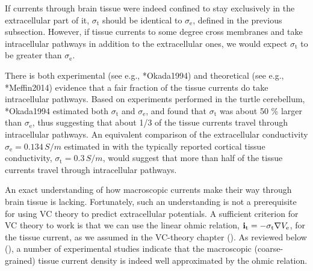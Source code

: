 
If currents through brain tissue were indeed confined to stay exclusively in the extracellular part of it, 
$\sigma_\text{t}$ should be identical to $\sigma_\text{e}$, defined in the previous subsection.
However, if tissue currents to some degree cross membranes and take intracellular pathways 
in addition to the extracellular ones, we would expect $\sigma_\text{t}$ to be greater than $\sigma_\text{e}$.

There is both experimental (see e.g., \citeasnoun**{Okada1994}) and theoretical (see e.g., \citeasnoun**{Meffin2014}) 
evidence that a fair fraction of the tissue currents do take intracellular pathways. 
Based on experiments performed in the turtle cerebellum, 
\citeasnoun**{Okada1994} estimated both $\sigma_\text{t}$ and $\sigma_\text{e}$, 
and found that $\sigma_\text{t}$ was about 50 \% larger than $\sigma_\text{e}$, 
thus suggesting that about 1/3 of the tissue currents travel through intracellular pathways.
An equivalent comparison of the extracellular conductivity $\sigma_\text{e} = 0.134\, \si{S/m}$ 
estimated in  with the typically reported cortical tissue conductivity, 
$\sigma_\text{t} = 0.3 \,\si{S/m}$, would suggest that more than half of the tissue currents 
travel through intracellular pathways.

An exact understanding of how macroscopic currents make their way through brain tissue is lacking. 
Fortunately, such an understanding is not a prerequisite for using VC theory to predict extracellular potentials.
A sufficient criterion for VC theory to work is that we can use the linear ohmic relation, 
${\bf i}_\text{t} = -\sigma_\text{t} \nabla V_\text{e}$, for the tissue current, 
as we assumed in the VC-theory chapter (). 
As reviewed below (), 
a number of experimental studies indicate that the macroscopic (coarse-grained) tissue current density is indeed
well approximated by the ohmic relation.

